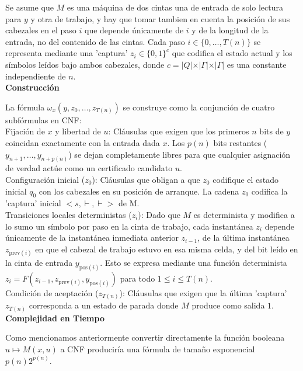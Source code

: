 Se asume que $M$ es una máquina de dos cintas una de entrada de solo lectura para $y$ y otra de trabajo, y hay que tomar tambien en cuenta la posición de sus cabezales en el paso $i$ que depende únicamente de $i$ y de la longitud de la entrada, no del contenido de las cintas. Cada paso $i \in \{0, \dots, T(n)\}$ se representa mediante una 'captura' $z_i \in \{0,1\}^c$ que codifica el estado actual y los símbolos leídos bajo ambos cabezales, donde $c = \vert{}Q\vert{} \times \vert{}\Gamma\vert{} \times \vert{}\Gamma\vert{}$ es una constante independiente de $n$. \\

\textbf{Construcción}

La fórmula $\omega_x(y, z_0, \dots, z_{T(n)})$ se construye como la conjunción de cuatro subfórmulas en CNF:\\ 

Fijación de $x$ y libertad de $u$: Cláusulas que exigen que los primeros $n$ bits de $y$ coincidan exactamente con la entrada dada $x$. Los $p(n)$ bits restantes ($y_{n+1}, \dots, y_{n+p(n)}$) se dejan completamente libres para que cualquier asignación de verdad actúe como un certificado candidato $u$.\\

Configuración inicial ($z_0$): Cláusulas que obligan a que $z_0$ codifique el estado inicial $q_0$ con los cabezales en su posición de arranque. La cadena $z_0$ codifica la 'captura' inicial $< s, \vdash,  \vdash>$ de M.\\

Transiciones locales deterministas ($z_i$): Dado que $M$ es determinista y modifica a lo sumo un símbolo por paso en la cinta de trabajo, cada instantánea $z_i$ depende únicamente de la instantánea inmediata anterior $z_{i-1}$, de la última instantánea $z_{\text{prev}(i)}$ en que el cabezal de trabajo estuvo en esa misma celda, y del bit leído en la cinta de entrada $y_{\text{pos}(i)}$. Esto se expresa mediante una función determinista $z_i = F(z_{i-1}, z_{\text{prev}(i)}, y_{\text{pos}(i)})$ para todo $1 \le i \le T(n)$.\\

Condición de aceptación ($z_{T(n)}$): Cláusulas que exigen que la última 'captura' $z_{T(n)}$ corresponda a un estado de parada donde $M$ produce como salida $1$.\\

\textbf{Complejidad en Tiempo}

Como mencionamos anteriormente convertir directamente la función booleana $u \mapsto M(x,u)$ a CNF produciría una fórmula de tamaño exponencial $p(n)2^{p(n)}$.\\ 

